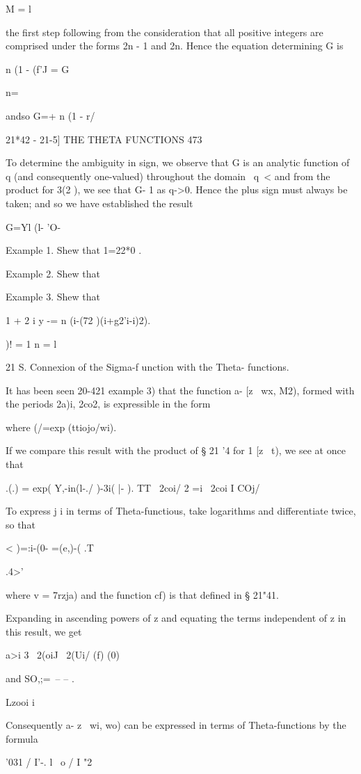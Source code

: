 M = l

the first step following from the consideration that all positive
integers are comprised under the forms 2n - 1 and 2n. Hence the
equation determining G is

n (1 - (f'J = G\

n=\

andso G=+ n (1 - r/

21*42 - 21-5] THE THETA FUNCTIONS 473

To determine the ambiguity in sign, we observe that G is an analytic
function of q (and consequently one-valued) throughout the domain \ q\
< \; and from the product for 3(2 ), we see that G- 1 as q->0. Hence
the plus sign must always be taken; and so we have established the
result

G=Yl (l- 'O-

Example 1. Shew that 1=22*0 .

Example 2. Shew that

Example 3. Shew that

1 + 2 i y -= n (i-(72 )(i+g2'i-i)2).

)! = 1 n = l

21 S. Connexion of the Sigma-f unction with the Theta- functions.

It has been seen 20-421 example 3) that the function a- [z \ wx, M2),
formed with the periods 2a)i, 2co2, is expressible in the form

where (/=exp (ttiojo/wi).

If we compare this result with the product of § 21 '4 for 1 [z \ t),
we see at once that

.(.) = exp( Y,-in(l-./ )-3i( |- ). TT \ 2coi/ 2 =i \ 2coi I COj/

To express j i in terms of Theta-functious, take logarithms and
differentiate twice, so that

 < )=:i-(0- =(e,)-( .T

.4>'

where v = 7rzja) and the function cf) is that defined in § 21"41.

Expanding in ascending powers of z and equating the terms independent
of z in this result, we get

a>i 3 \ 2(oiJ \ 2(Ui/ (f) (0)

and SO,;=\ -- -- .

Lzooi i

Consequently a- z \ wi, wo) can be expressed in terms of
Theta-functions by the formula

'031 / I'-. l \ o / I "2

